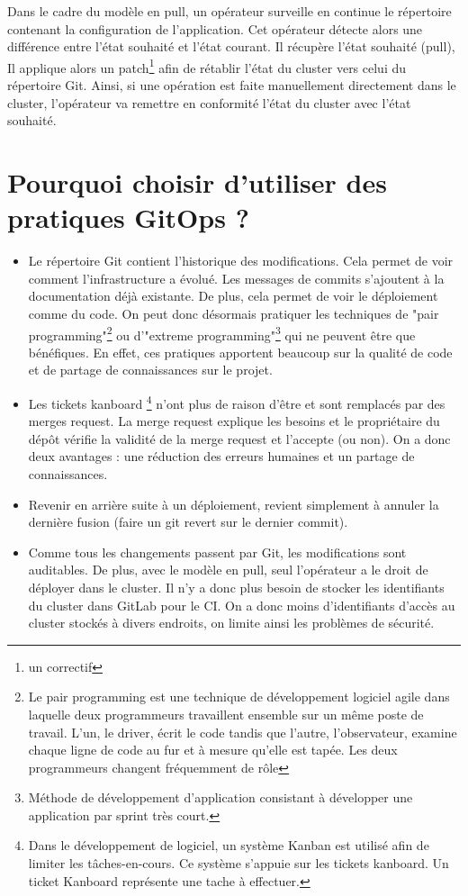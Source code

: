 \documentclass[11pt,fleqn]{book} %
\begin{document}
Dans le cadre du modèle en pull, un opérateur surveille en continue le répertoire contenant la configuration de l'application. Cet opérateur détecte alors une différence entre l'état souhaité et l'état courant. Il récupère l'état souhaité (pull), Il applique alors un patch\footnote{un correctif} afin de rétablir l'état du cluster vers celui du répertoire Git. Ainsi, si une opération est faite manuellement directement dans le cluster, l'opérateur va remettre en conformité l'état du cluster avec l'état souhaité.

\section{Pourquoi choisir d'utiliser des pratiques GitOps ? }
\begin{itemize}
    \item Le répertoire Git contient l'historique des modifications. Cela permet de voir comment l'infrastructure a évolué. Les messages de commits s'ajoutent à la documentation déjà existante. De plus, cela permet de voir le déploiement comme du code. On peut donc désormais pratiquer les techniques de "pair programming"\footnote{Le pair programming est une technique de développement logiciel agile dans laquelle deux programmeurs travaillent ensemble sur un même poste de travail. L'un, le driver, écrit le code tandis que l'autre, l'observateur, examine chaque ligne de code au fur et à mesure qu'elle est tapée. Les deux programmeurs changent fréquemment de rôle
} ou d'"extreme programming"\footnote{Méthode de développement d'application consistant à développer une application par sprint très court.} qui ne peuvent être que bénéfiques. En effet, ces pratiques apportent beaucoup sur la qualité de code et de partage de connaissances sur le projet.
    \item Les tickets kanboard \footnote{Dans le développement de logiciel, un système Kanban  est utilisé afin de limiter les tâches-en-cours. Ce système s'appuie sur les tickets kanboard. Un ticket Kanboard représente une tache à effectuer.} n'ont plus de raison d'être et sont remplacés par des merges request. La merge request explique les besoins et le propriétaire du dépôt vérifie la validité de la merge request et l'accepte (ou non). On a donc deux avantages :  une réduction des erreurs humaines et un partage de connaissances.
    \item Revenir en arrière suite à un déploiement, revient simplement à annuler la dernière fusion (faire un git revert sur le dernier commit).
    \item Comme tous les changements passent par Git, les modifications sont auditables. De plus, avec le  modèle en pull, seul l’opérateur a le droit de déployer dans le cluster. Il n'y a donc plus besoin de stocker les identifiants du cluster dans GitLab pour le CI. On a donc moins d'identifiants d'accès au cluster stockés à divers endroits, on limite ainsi les problèmes de sécurité.
\end{itemize}
\end{document}
